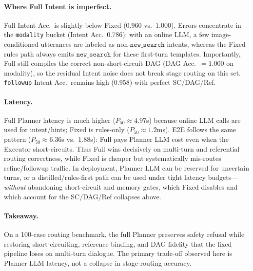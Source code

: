 \paragraph{Where Full Intent is imperfect.}
Full Intent Acc.\ is slightly below Fixed ($0.960$ vs.\ $1.000$).
Errors concentrate in the \texttt{modality} bucket (Intent Acc.\ $0.786$):
with an online LLM, a few image-conditioned utterances are labeled as non-$\texttt{new\_search}$ intents,
whereas the Fixed rules path always emits $\texttt{new\_search}$ for these first-turn templates.
Importantly, Full still compiles the correct non-short-circuit DAG (DAG Acc.\ $=1.000$ on modality),
so the residual Intent noise does not break stage routing on this set.
\texttt{followup} Intent Acc.\ remains high ($0.958$) with perfect SC/DAG/Ref.

\paragraph{Latency.}
Full Planner latency is much higher ($P_{50}\!\approx\!4.97$s) because online LLM calls are used for intent/hints;
Fixed is rules-only ($P_{50}\!\approx\!1.2$ms).
E2E follows the same pattern ($P_{50}\!\approx\!6.36$s vs.\ $1.88$s): Full pays Planner LLM cost even when the Executor short-circuits.
Thus Full wins decisively on multi-turn and referential routing correctness, while Fixed is cheaper but systematically mis-routes refine/followup traffic.
In deployment, Planner LLM can be reserved for uncertain turns, or a distilled/rules-first path can be used under tight latency budgets---\emph{without} abandoning short-circuit and memory gates, which Fixed disables and which account for the SC/DAG/Ref collapses above.

\paragraph{Takeaway.}
On a 100-case routing benchmark, the full Planner preserves safety refusal while restoring short-circuiting, reference binding, and DAG fidelity that the fixed pipeline loses on multi-turn dialogue.
The primary trade-off observed here is Planner LLM latency, not a collapse in stage-routing accuracy.
